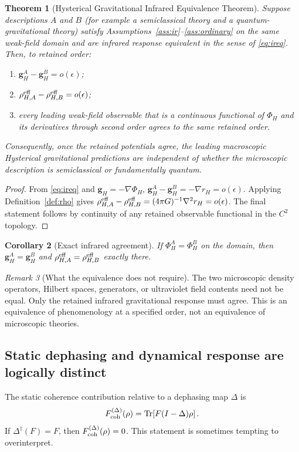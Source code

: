 \documentclass[11pt]{article}
\newtheorem{theorem}{Theorem}[section]
\newtheorem{corollary}[theorem]{Corollary}
\theoremstyle{definition}
\theoremstyle{remark}
\newtheorem{remark}[theorem]{Remark}
\newcommand{\Tr}{\operatorname{Tr}}
\begin{document}
\begin{theorem}[Hysterical Gravitational Infrared Equivalence Theorem]\label{thm:main}
Suppose descriptions $A$ and $B$ (for example a semiclassical theory and a quantum-gravitational theory) satisfy Assumptions~\ref{ass:ir}--\ref{ass:ordinary} on the same weak-field domain and are infrared response equivalent in the sense of \eqref{eq:ireq}. Then, to retained order:
\begin{enumerate}[label=(\roman*)]
 \item $\mathbf g_H^A-\mathbf g_H^B=o(\epsilon)$;
 \item $\rho_{H,A}^{\rm eff}-\rho_{H,B}^{\rm eff}=o(\epsilon)$;
 \item every leading weak-field observable that is a continuous functional of $\Phi_H$ and its derivatives through second order agrees to the same retained order.
\end{enumerate}
Consequently, once the retained potentials agree, the leading macroscopic Hysterical gravitational predictions are independent of whether the microscopic description is semiclassical or fundamentally quantum.
\end{theorem}
\begin{proof}
From \eqref{eq:ireq} and $\mathbf g_H=-\nabla\Phi_H$,
$\mathbf g_H^A-\mathbf g_H^B=-\nabla r_H=o(\epsilon)$. Applying Definition~\ref{def:rho} gives
$\rho_{H,A}^{\rm eff}-\rho_{H,B}^{\rm eff}=(4\pi G)^{-1}\nabla^2r_H=o(\epsilon)$. The final statement follows by continuity of any retained observable functional in the $C^2$ topology.
\end{proof}

\begin{corollary}[Exact infrared agreement]
If $\Phi_H^A=\Phi_H^B$ on the domain, then $\mathbf g_H^A=\mathbf g_H^B$ and $\rho_{H,A}^{\rm eff}=\rho_{H,B}^{\rm eff}$ exactly there.
\end{corollary}

\begin{remark}[What the equivalence does not require]
The two microscopic density operators, Hilbert spaces, generators, or ultraviolet field contents need not be equal. Only the retained infrared gravitational response must agree. This is an equivalence of phenomenology at a specified order, not an equivalence of microscopic theories.
\end{remark}

\subsection{Static dephasing and dynamical response are logically distinct}\label{sec:nogo}
The static coherence contribution relative to a dephasing map $\Delta$ is
\begin{equation}
 F_{\rm coh}^{(\Delta)}(\rho)=\Tr\!\left[F(I-\Delta)\rho\right].
\end{equation}
If $\Delta^\dagger(F)=F$, then $F_{\rm coh}^{(\Delta)}(\rho)=0$.
This statement is sometimes tempting to overinterpret.
\end{document}
